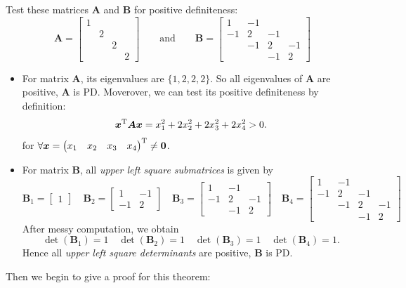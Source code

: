 \begin{example}
Test these matrices $\bm A$ and $\bm B$ for positive definiteness:
\[
\bm A=\begin{bmatrix}
1&&&\\&2&&\\&&2&\\&&&2
\end{bmatrix}\qquad\text{and}\qquad
\bm B=\begin{bmatrix}
1&-1&&\\-1&2&-1&\\&-1&2&-1\\&&-1&2
\end{bmatrix}
\]
\begin{itemize}
\item
For matrix $\bm A$, its eigenvalues are $\{1,2,2,2\}.$ So all eigenvalues of $\bm A$ are positive, $\bm A$ is PD. Moverover, we can test its positive definiteness by definition: 
\[
\bm x^{\mathrm T}\bm A\bm x=x_1^2+2x_2^2+2x_3^2+2x_4^2>0.
\]
for $\forall\bm x=\begin{pmatrix}
x_1&x_2&x_3&x_4
\end{pmatrix}^{\mathrm T}\ne\bm 0$.
\item
For matrix $\bm B$, all \textit{upper left square submatrices} is given by
\[
\bm B_1=\begin{bmatrix}
1
\end{bmatrix}\quad
\bm B_2=\begin{bmatrix}
1&-1\\-1&2
\end{bmatrix}\quad
\bm B_3=\begin{bmatrix}
1&-1&\\-1&2&-1\\&-1&2
\end{bmatrix}\quad
\bm B_4=\begin{bmatrix}
1&-1&&\\-1&2&-1&\\&-1&2&-1\\&&-1&2
\end{bmatrix}
\]
After messy computation, we obtain
\[
\det(\bm B_1)=1\quad\det(\bm B_2)=1\quad
\det(\bm B_3)=1\quad\det(\bm B_4)=1.
\]
Hence all \textit{upper left square determinants} are positive, $\bm B$ is PD.
\end{itemize}
\end{example}
\newpage
Then we begin to give a proof for this theorem:
